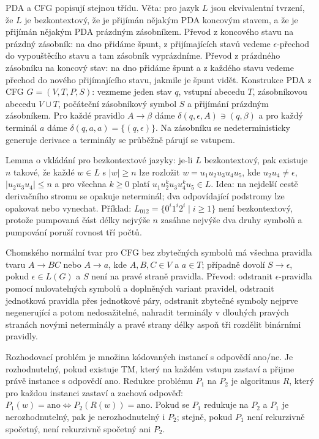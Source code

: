 \begin{odpoved}
PDA a CFG popisují stejnou třídu. Věta: pro jazyk $L$ jsou ekvivalentní tvrzení, že
$L$ je bezkontextový, že je přijímán nějakým PDA koncovým stavem, a že je přijímán
nějakým PDA prázdným zásobníkem. Převod z koncového stavu na prázdný zásobník: na dno
přidáme špunt, z přijímajících stavů vedeme $\epsilon$-přechod do vypouštěcího stavu a
tam zásobník vyprázdníme. Převod z prázdného zásobníku na koncový stav: na dno přidáme
špunt a z každého stavu vedeme přechod do nového přijímajícího stavu, jakmile je špunt
vidět. Konstrukce PDA z CFG $G=(V,T,P,S)$: vezmeme jeden stav $q$, vstupní abecedu
$T$, zásobníkovou abecedu $V\cup T$, počáteční zásobníkový symbol $S$ a přijímání
prázdným zásobníkem. Pro každé pravidlo $A\to\beta$ dáme
$\delta(q,\epsilon,A)\ni(q,\beta)$ a pro každý terminál $a$ dáme
$\delta(q,a,a)=\{(q,\epsilon)\}$. Na zásobníku se nedeterministicky generuje derivace a
terminály se průběžně párují se vstupem.

Lemma o vkládání pro bezkontextové jazyky: je-li $L$ bezkontextový, pak existuje $n$
takové, že každé $w\in L$ s $|w|\ge n$ lze rozložit
$w=u_1u_2u_3u_4u_5$, kde $u_2u_4\ne\epsilon$, $|u_2u_3u_4|\le n$ a pro všechna
$k\ge0$ platí $u_1u_2^ku_3u_4^ku_5\in L$. Idea: na nejdelší cestě derivačního stromu
se opakuje neterminál; dva odpovídající podstromy lze opakovat nebo vynechat.
Příklad: $L_{012}=\{0^i1^i2^i\mid i\ge1\}$ není bezkontextový, protože pumpovaná část
délky nejvýše $n$ zasáhne nejvýše dva druhy symbolů a pumpování poruší rovnost tří
počtů.

Chomského normální tvar pro CFG bez zbytečných symbolů má všechna pravidla tvaru
$A\to BC$ nebo $A\to a$, kde $A,B,C\in V$ a $a\in T$; případně dovolí $S\to\epsilon$, pokud $\epsilon\in L(G)$ a $S$ není na pravé straně pravidla. Převod: odstranit
$\epsilon$-pravidla pomocí nulovatelných symbolů a doplněných variant pravidel,
odstranit jednotková pravidla přes jednotkové páry, odstranit zbytečné symboly
nejprve negenerující a potom nedosažitelné, nahradit terminály v dlouhých pravých
stranách novými neterminály a pravé strany délky aspoň tři rozdělit binárními pravidly.

Rozhodovací problém je množina kódovaných instancí s odpovědí ano/ne. Je rozhodnutelný,
pokud existuje TM, který na každém vstupu zastaví a přijme právě instance s odpovědí ano.
Redukce problému $P_1$ na $P_2$ je algoritmus $R$, který pro každou instanci zastaví a
zachová odpověď:
$P_1(w)=\text{ano}\Leftrightarrow P_2(R(w))=\text{ano}$. Pokud se $P_1$ redukuje na
$P_2$ a $P_1$ je nerozhodnutelný, pak je nerozhodnutelný i $P_2$; stejně, pokud $P_1$
není rekurzivně spočetný, není rekurzivně spočetný ani $P_2$.


\end{odpoved}
